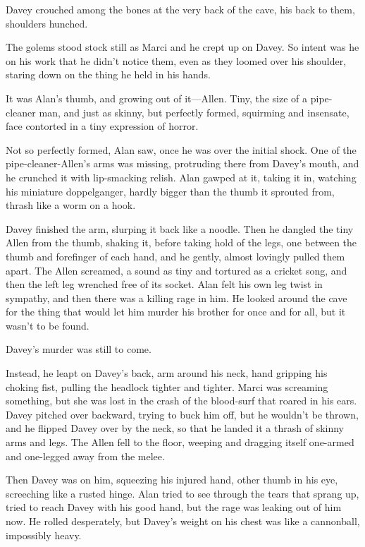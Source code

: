 Davey crouched among the bones at the very back of the cave, his back
to them, shoulders hunched.

The golems stood stock still as Marci and he crept up on Davey.  So
intent was he on his work that he didn't notice them, even as they
loomed over his shoulder, staring down on the thing he held in his
hands.

It was Alan's thumb, and growing out of it---Allen.  Tiny, the size of
a pipe-cleaner man, and just as skinny, but perfectly formed,
squirming and insensate, face contorted in a tiny expression of
horror.

Not so perfectly formed, Alan saw, once he was over the initial shock. 
One of the pipe-cleaner-Allen's arms was missing, protruding there
from Davey's mouth, and he crunched it with lip-smacking relish.  Alan
gawped at it, taking it in, watching his miniature doppelganger,
hardly bigger than the thumb it sprouted from, thrash like a worm on a
hook.

Davey finished the arm, slurping it back like a noodle.  Then he
dangled the tiny Allen from the thumb, shaking it, before taking hold
of the legs, one between the thumb and forefinger of each hand, and he
gently, almost lovingly pulled them apart.  The Allen screamed, a
sound as tiny and tortured as a cricket song, and then the left leg
wrenched free of its socket.  Alan felt his own leg twist in sympathy,
and then there was a killing rage in him.  He looked around the cave
for the thing that would let him murder his brother for once and for
all, but it wasn't to be found.

Davey's murder was still to come.

Instead, he leapt on Davey's back, arm around his neck, hand gripping
his choking fist, pulling the headlock tighter and tighter.  Marci was
screaming something, but she was lost in the crash of the blood-surf
that roared in his ears.  Davey pitched over backward, trying to buck
him off, but he wouldn't be thrown, and he flipped Davey over by the
neck, so that he landed it a thrash of skinny arms and legs.  The
Allen fell to the floor, weeping and dragging itself one-armed and
one-legged away from the melee.

Then Davey was on him, squeezing his injured hand, other thumb in his
eye, screeching like a rusted hinge.  Alan tried to see through the
tears that sprang up, tried to reach Davey with his good hand, but the
rage was leaking out of him now.  He rolled desperately, but Davey's
weight on his chest was like a cannonball, impossibly heavy.

